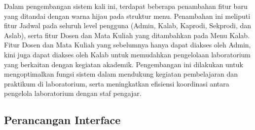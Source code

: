 Dalam pengembangan sistem kali ini, terdapat beberapa penambahan fitur baru yang ditandai dengan warna hijau pada struktur menu. Penambahan ini meliputi fitur Jadwal pada seluruh level pengguna (Admin, Kalab, Kaprodi, Sekprodi, dan Aslab), serta fitur Dosen dan Mata Kuliah yang ditambahkan pada Menu Kalab. Fitur Dosen dan Mata Kuliah yang sebelumnya hanya dapat diakses oleh Admin, kini juga dapat diakses oleh Kalab untuk memudahkan pengelolaan laboratorium yang berkaitan dengan kegiatan akademik. Pengembangan ini dilakukan untuk mengoptimalkan fungsi sistem dalam mendukung kegiatan pembelajaran dan praktikum di laboratorium, serta meningkatkan efisiensi koordinasi antara pengelola laboratorium dengan staf pengajar.

\subsection{Perancangan Interface}